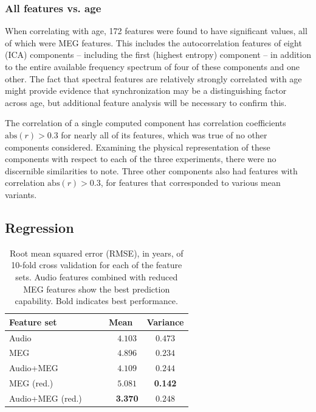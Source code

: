 \documentclass[utf8]{frontiersSCNS} %
\begin{document}
\subsubsection{All features vs. age}

When correlating with age, 172 features were found to have significant values, all of which were MEG features. This includes the autocorrelation features of eight (ICA) components -- including the first (highest entropy) component -- in addition to the entire available frequency spectrum of four of these components and one other. The fact that spectral features are relatively strongly correlated with age might provide evidence that synchronization may be a distinguishing factor across age, but additional feature analysis will be necessary to confirm this.

The correlation of a single computed component has correlation coefficients $\text{abs}(r)>0.3$ for nearly all of its features, which was true of no other components considered. Examining the physical representation of these components with respect to each of the three experiments, there were no discernible similarities to note. Three other components also had features with correlation $\text{abs}(r)>0.3$, for features that corresponded to various mean variants.

\subsection{Regression}

\begin{table}[t]
  \centering
  \label{tab:reg_results}
  \begin{tabular}{| l | c | c |}
    \toprule
    \multicolumn{1}{l}{\textbf{Feature set}} & \multicolumn{1}{c}{\textbf{Mean}} & \multicolumn{1}{c}{\textbf{Variance}} \\
    \toprule
        Audio~~~                             & ~~~$4.103$         &     $0.473$       \\
        MEG~~~                               & ~~~$4.896$         &     $0.234$       \\
        Audio+MEG~~~                         & ~~~$4.109$         &     $0.244$       \\

        \midrule
       
        MEG (red.)~~~                        & ~~~$5.081$         &     \textbf{0.142}       \\
        Audio+MEG (red.)~~~                  & ~~~\textbf{3.370}         &     $0.248$       \\

        \bottomrule
  \end{tabular}
  \caption{Root mean squared error (RMSE), in years, of 10-fold cross validation for each of the feature sets. Audio features combined with reduced MEG features show the best prediction capability. Bold indicates best performance.}
\end{table}
\end{document}
